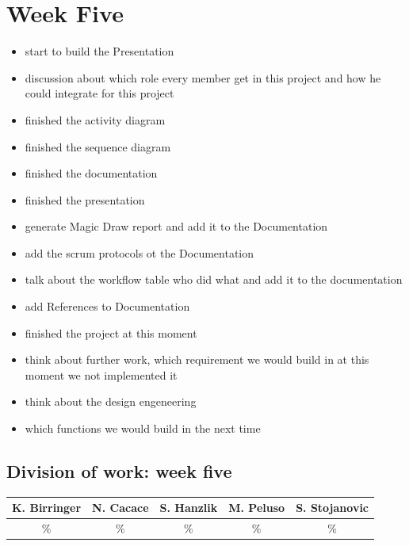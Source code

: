 \documentclass[a4paper, 12pt]{article}
\begin{document}
\section{Week Five}
\begin{itemize}
\item start to build the Presentation
\item discussion about which role every member get in this project and how he could integrate for this project
\item finished the activity diagram
\item finished the sequence diagram
\item finished the documentation
\item finished the presentation
\item generate Magic Draw report and add it to the Documentation
\item add the scrum protocols ot the Documentation
\item talk about the workflow table who did what and add it to the documentation
\item add References to Documentation 
\item finished the project at this moment
\item think about further work, which requirement we would build in at this moment we not implemented it
\item think about the design engeneering 
\item which functions we would build in the next time
\end{itemize}

\subsection{Division of work: week five}

\begin{table}[h]
\centering
\setlength{\tabcolsep}{12pt}
\begin{tabular}{|c|c|c|c|c|}
\hline
K. Birringer & N. Cacace & S. Hanzlik & M. Peluso & S. Stojanovic\\
\hline
\% & \% & \% & \% & \% \\ 
\hline
\end{tabular}
\end{table}
\end{document}
